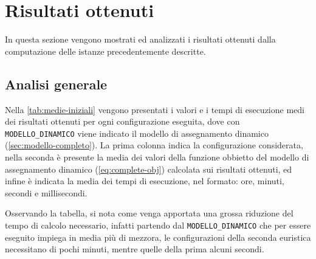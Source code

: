 



\section{Risultati ottenuti}

In questa sezione vengono mostrati ed analizzati i risultati ottenuti dalla computazione delle istanze precedentemente descritte.

\subsection{Analisi generale}

Nella \autoref{tab:medie-iniziali} vengono presentati i valori e i tempi di esecuzione medi dei risultati ottenuti per ogni configurazione eseguita, dove con \texttt{MODELLO\_DINAMICO} viene indicato il modello di assegnamento dinamico (\ref{sec:modello-completo}). La prima colonna indica la configurazione considerata, nella seconda è presente la media dei valori della funzione obbietto del modello di assegnamento dinamico (\autoref{eq:complete-obj}) calcolata sui risultati ottenuti, ed infine è indicata la media dei tempi di esecuzione, nel formato: ore, minuti, secondi e millisecondi.

Osservando la tabella, si nota come venga apportata una grossa riduzione del tempo di calcolo necessario, infatti partendo dal \texttt{MODELLO\_DINAMICO} che per essere eseguito impiega in media più di mezzora, le configurazioni della seconda euristica necessitano di pochi minuti, mentre quelle della prima alcuni secondi.

